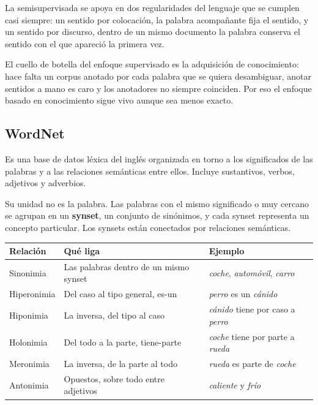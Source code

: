 \documentclass[11pt,letterpaper]{article}
\begin{document}
La semisupervisada se apoya en dos regularidades del lenguaje que se
cumplen casi siempre: un sentido por colocación, la palabra
acompañante fija el sentido, y un sentido por discurso, dentro de un
mismo documento la palabra conserva el sentido con el que apareció la
primera vez.

\begin{ojo}
    El cuello de botella del enfoque supervisado es la adquisición de
    conocimiento: hace falta un corpus anotado por cada palabra que
    se quiera desambiguar, anotar sentidos a mano es caro y los
    anotadores no siempre coinciden. Por eso el enfoque basado en
    conocimiento sigue vivo aunque sea menos exacto.
\end{ojo}

\subsection*{WordNet}

Es una base de datos léxica del inglés organizada en torno a los
significados de las palabras y a las relaciones semánticas entre
ellos. Incluye sustantivos, verbos, adjetivos y adverbios.

Su unidad no es la palabra. Las palabras con el mismo significado o
muy cercano se agrupan en un \textbf{synset}, un conjunto de
sinónimos, y cada synset representa un concepto particular. Los
synsets están conectados por relaciones semánticas.

\begin{center}
\begin{tabular}{>{\raggedright\arraybackslash}p{2.6cm}
                >{\raggedright\arraybackslash}p{5.2cm}
                >{\raggedright\arraybackslash}p{5.2cm}}
    \toprule
    \textbf{Relación} & \textbf{Qué liga} & \textbf{Ejemplo} \\
    \midrule
    Sinonimia & Las palabras dentro de un mismo synset &
    \textit{coche}, \textit{automóvil}, \textit{carro} \\
    \addlinespace
    Hiperonimia & Del caso al tipo general, es-un &
    \textit{perro} es un \textit{cánido} \\
    \addlinespace
    Hiponimia & La inversa, del tipo al caso &
    \textit{cánido} tiene por caso a \textit{perro} \\
    \addlinespace
    Holonimia & Del todo a la parte, tiene-parte &
    \textit{coche} tiene por parte a \textit{rueda} \\
    \addlinespace
    Meronimia & La inversa, de la parte al todo &
    \textit{rueda} es parte de \textit{coche} \\
    \addlinespace
    Antonimia & Opuestos, sobre todo entre adjetivos &
    \textit{caliente} y \textit{frío} \\
    \bottomrule
\end{tabular}
\end{center}
\end{document}
